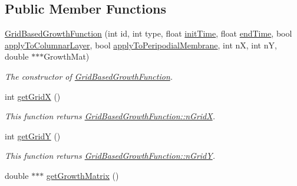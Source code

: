 \subsection*{Public Member Functions}
\begin{DoxyCompactItemize}
\item 
\hyperlink{classGridBasedGrowthFunction_a1533e384b3ab79323e91ce68245c9a10}{Grid\+Based\+Growth\+Function} (int id, int type, float \hyperlink{classGrowthFunctionBase_ae92513a7b41637df8e26e7db35ddf97c}{init\+Time}, float \hyperlink{classGrowthFunctionBase_a3ff4db0573d354a75666a5f3ca446941}{end\+Time}, bool \hyperlink{classGrowthFunctionBase_a3d56771e7c145589a14e11cc331e0326}{apply\+To\+Columnar\+Layer}, bool \hyperlink{classGrowthFunctionBase_a08ae19f58cb98fa8e315a77f52749732}{apply\+To\+Peripodial\+Membrane}, int n\+X, int n\+Y, double $\ast$$\ast$$\ast$Growth\+Mat)
\begin{DoxyCompactList}\small\item\em The constructor of \hyperlink{classGridBasedGrowthFunction}{Grid\+Based\+Growth\+Function}. \end{DoxyCompactList}\item 
\hypertarget{classGridBasedGrowthFunction_ae36e6ea2e7bdf41459e74d5846d6d24d}{}int \hyperlink{classGridBasedGrowthFunction_ae36e6ea2e7bdf41459e74d5846d6d24d}{get\+Grid\+X} ()\label{classGridBasedGrowthFunction_ae36e6ea2e7bdf41459e74d5846d6d24d}

\begin{DoxyCompactList}\small\item\em This function returns \hyperlink{classGridBasedGrowthFunction_af872b9963f3a579dcd615c23bcb58a86}{Grid\+Based\+Growth\+Function\+::n\+Grid\+X}. \end{DoxyCompactList}\item 
\hypertarget{classGridBasedGrowthFunction_a4a70e9e187e3079e29115f106d30e26e}{}int \hyperlink{classGridBasedGrowthFunction_a4a70e9e187e3079e29115f106d30e26e}{get\+Grid\+Y} ()\label{classGridBasedGrowthFunction_a4a70e9e187e3079e29115f106d30e26e}

\begin{DoxyCompactList}\small\item\em This function returns \hyperlink{classGridBasedGrowthFunction_a625bc963a1f1e7d1f1a35dbd0ef51728}{Grid\+Based\+Growth\+Function\+::n\+Grid\+Y}. \end{DoxyCompactList}\item 
\hypertarget{classGridBasedGrowthFunction_ac25ac1f12b74816a1d3d3e5dda0e8541}{}double $\ast$$\ast$$\ast$ \hyperlink{classGridBasedGrowthFunction_ac25ac1f12b74816a1d3d3e5dda0e8541}{get\+Growth\+Matrix} ()\label{classGridBasedGrowthFunction_ac25ac1f12b74816a1d3d3e5dda0e8541}


\end{DoxyCompactItemize}
